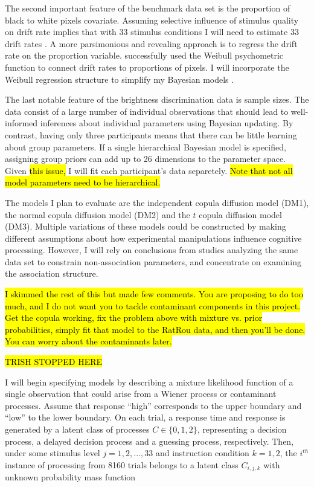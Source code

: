 \documentclass[12pt]{article}
\newcommand{\trish}[1]{\textrm{\hl{#1}}}
\begin{document}
The second important feature of the benchmark data set is the
proportion of black to white pixels covariate. Assuming selective
influence of stimulus quality on drift rate implies that with 33
stimulus conditions I will need to estimate 33 drift rates
\citep{VosRot2004}. A more parsimonious and revealing approach is to
regress the drift rate on the proportion
variable. \citet{VanTue2008,VanTue2011} successfully used the Weibull
psychometric function to connect drift rates to proportions of
pixels. I will incorporate the Weibull regression structure to
simplify my Bayesian models \citep{PerVan2002,Rat2014}.
    
The last notable feature of the brightness discrimination data is
sample sizes. The data consist of a large number of individual
observations that should lead to well-informed inferences about
individual parameters using Bayesian updating. By contrast,
having only three participants means that there can be little
learning about group parameters.  If a single
hierarchical Bayesian model is specified, assigning group priors can
add up to 26 dimensions to the parameter space. Given \trish{this
issue,} I will fit each participant's data separetely. \trish{Note
that not all model parameters need to be hierarchical.}

The models I plan to evaluate are the
independent copula diffusion model (DM1), the normal
copula diffusion model (DM2) and the $t$ copula
diffusion model (DM3). Multiple variations of these
models could be constructed by making different assumptions about how
experimental manipulations influence cognitive processing. However, I
will rely on conclusions from studies analyzing the same data set to
constrain non-association parameters, and concentrate on examining the
association structure.

\trish{I skimmed the rest of this but made few comments.  You are
proposing to do too much, and I do not want you to tackle contaminant
components in this project.  Get the copula working, fix the problem
above with mixture vs. prior probabilities, simply fit that model to
the RatRou data, and then you'll be done.  You can worry about the
contaminants later.}

\trish{TRISH STOPPED HERE}
 
I will begin specifying models by describing a mixture likelihood
function of a single observation that could arise from a Wiener
process or contaminant processes. Assume that response ``high''
corresponds to the upper boundary and ``low'' to the lower
boundary. On each trial, a response time and response is generated by
a latent class of processes $C \in \{0, 1, 2\}$, representing a
decision process, a delayed decision process and a guessing process,
respectively. Then, under some stimulus level $j = 1, 2, \dots, 33$
and instruction condition $k = 1, 2$, the $i^{th}$ instance of
processing from 8160 trials belongs to a latent class $C_{i,j,k}$ with
unknown probability mass function
    
\end{document}
